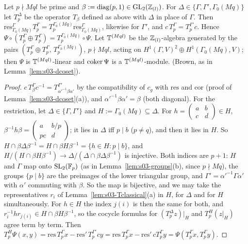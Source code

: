 \begin{lemma}\label{lem:s03-PsiHecke}
Let $p\nmid Mql$ be prime and $\beta:=\mathrm{diag}(p,1)\in\mathrm{GL}_2(\mathbb{Z}_{(l)})$. For $\Delta\in\{\Gamma,\Gamma',\Gamma_0(Mq)\}$ let $T_p^\Delta$ be the operator
$T_\beta$ defined as above with $\Delta$ in place of $\Gamma$. Then $\mathrm{res}^\Gamma_{\Gamma_0(Mq)}T_p^\Gamma=T_p^{\Gamma_0(Mq)}\mathrm{res}^\Gamma_{\Gamma_0(Mq)}$, likewise for
$\Gamma'$, and $c\,T_p^\Gamma=T_p^{\Gamma'}c$. Hence $\Psi\circ(T^\Gamma_p\oplus T^\Gamma_p)=T^{\Gamma_0(Mq)}_p\circ\Psi$. Let $\mathbb{T}^{(Mql)}$ be the $\mathbb{Z}_{(l)}$-algebra generated by the
pairs $(T_p^\Gamma\oplus T_p^\Gamma,\,T_p^{\Gamma_0(Mq)})$, $p\nmid Mql$, acting on $H^1(\Gamma,V)^2\oplus H^1(\Gamma_0(Mq),V)$; then $\Psi$ is $\mathbb{T}^{(Mql)}$-linear and
$\operatorname{coker}\Psi$ is a $\mathbb{T}^{(Mql)}$-module. \stpmc{} (Brown, as in Lemma~\ref{lem:s03-dcoset}).
\end{lemma}
\begin{proof}
$c\,T_\beta^\Gamma c^{-1}=T^{\Gamma'}_{\alpha'^{-1}\beta\alpha'}$ by the compatibility of $c_g$ with $\mathrm{res}$ and $\mathrm{cor}$ (proof of Lemma~\ref{lem:s03-dcoset}(a)), and
$\alpha'^{-1}\beta\alpha'=\beta$ (both diagonal). For the restriction, let $\Delta\in\{\Gamma,\Gamma'\}$ and $H:=\Gamma_0(Mq)\subseteq\Delta$. For $h=\left(\begin{smallmatrix}a&b\\c&d\end{smallmatrix}\right)\in H$,
$\beta^{-1}h\beta=\left(\begin{smallmatrix}a&b/p\\pc&d\end{smallmatrix}\right)$; it lies in $\Delta$ iff $p\mid b$ ($p\ne q$), and then it lies in $H$. So
$H\cap\beta\Delta\beta^{-1}=H\cap\beta H\beta^{-1}=\{h\in H:p\mid b\}$, and $H/(H\cap\beta H\beta^{-1})\to\Delta/(\Delta\cap\beta\Delta\beta^{-1})$ is injective. Both indices are $p+1$:
$H$ and $\Gamma$ map onto $\mathrm{SL}_2(\mathbb{F}_p)$ (as in Lemma~\ref{lem:s03-groups}(b), since $p\nmid Mq$), the groups $\{p\mid b\}$ are the preimages of the lower triangular group, and
$\Gamma'=\alpha'^{-1}\Gamma\alpha'$ with $\alpha'$ commuting with $\beta$. So the map is bijective, and we may take the representatives $r_i$ of
Lemma~\ref{lem:s03-Tclassical}(a) in $H$, for $\Delta$ and for $H$ simultaneously. For $h\in H$ the index $j(i)$ is then the same for both, and
$r_i^{-1}hr_{j(i)}\in H\cap\beta H\beta^{-1}$, so the cocycle formulas for $(T^\Delta_pz)|_H$ and $T^H_p(z|_H)$ agree term by term. Then
$T^{H}_p\Psi(x,y)=\mathrm{res}\,T^\Gamma_px-\mathrm{res}'\,T^{\Gamma'}_pcy=\mathrm{res}\,T^\Gamma_px-\mathrm{res}'\,cT^\Gamma_py=\Psi(T^\Gamma_px,T^\Gamma_py)$.
\end{proof}

